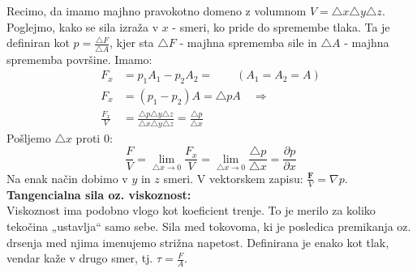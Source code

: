 \documentclass[mat2, tisk]{fmfdelo}
\newcommand{\bd}{\textbf}
\begin{document}
Recimo, da imamo majhno pravokotno domeno z volumnom $V = \triangle x \triangle y  \triangle z$.
Poglejmo, kako se sila izraža v $x$ - smeri, ko pride do spremembe tlaka. Ta je definiran kot $p = \frac{\triangle F}{\triangle A}$, 
kjer sta $\triangle F$ - majhna sprememba sile in $\triangle A$ - majhna sprememba površine. Imamo:
\begin{align*}
F_x &= p_1 A_1 - p_2 A_2 = \quad \quad(A_1 = A_2 = A) \\
F_x &= (p_1 - p_2)A = \triangle p A \quad \Longrightarrow \\
\frac{F_x}{V} &= \frac{\triangle p \triangle y \triangle z}{\triangle x \triangle y \triangle z} = \frac{\triangle p}{\triangle x}
\end{align*}
Pošljemo $\triangle x$ proti $0$:
$$
\frac{F}{V} = \lim_{\triangle x \rightarrow 0 }\frac{F_x}{V} = \lim_{\triangle x \rightarrow 0} \frac{\triangle p}{\triangle x} = \frac{\partial p}{\partial x}
$$
Na enak način dobimo v $y$ in $z$ smeri. V vektorskem zapisu: 
$\frac{\bd{F}}{V} = \nabla p$.
\noindent
\textbf{Tangencialna sila oz. viskoznost:} \\[1mm]
Viskoznost ima podobno vlogo kot koeficient trenje. To je merilo za koliko tekočina 
„ustavlja“ samo sebe. Sila med tokovoma, ki je posledica 
premikanja oz. drsenja med njima imenujemo strižna napetost. Definirana je enako kot tlak, vendar kaže v drugo smer, tj. $\tau = \frac{F}{A}$.
\begin{center}
\end{center}
\end{document}
